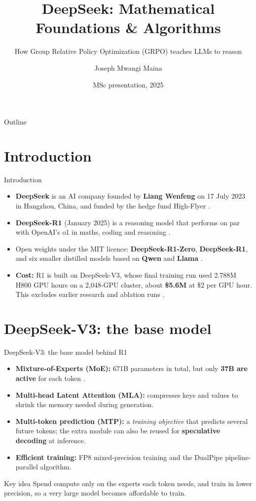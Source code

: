 \documentclass[xcolor=svgnames]{beamer}
\title[DeepSeek: Maths \& Algorithms]{DeepSeek: Mathematical Foundations \& Algorithms}
\subtitle{How Group Relative Policy Optimization (GRPO) teaches LLMs to reason}
\author[Joseph Mwangi Maina]{Joseph Mwangi Maina}
\institute[AIMS Rwanda]{African Institute for Mathematical Sciences (AIMS) Rwanda}
\date{MSc presentation, 2025}
\begin{document}
\frame{\titlepage}

\begin{frame}{Outline}
  \tableofcontents
\end{frame}

\section{Introduction}
\begin{frame}{Introduction}
\begin{itemize}
  \item \textbf{DeepSeek} is an AI company founded by \textbf{Liang Wenfeng} on 17 July 2023 in Hangzhou, China, and funded by the hedge fund High-Flyer \cite{sallam2025deepseek}.
  \item \textbf{DeepSeek-R1} (January 2025) is a reasoning model that performs on par with OpenAI's o1 in maths, coding and reasoning \cite{guo2025deepseekr1}.
  \item Open weights under the MIT licence: \textbf{DeepSeek-R1-Zero}, \textbf{DeepSeek-R1}, and six smaller distilled models based on \textbf{Qwen} and \textbf{Llama} \cite{deepseekr1github}.
  \item \textbf{Cost:} R1 is built on DeepSeek-V3, whose final training run used 2.788M H800 GPU hours on a 2,048-GPU cluster, about \textbf{\$5.6M} at \$2 per GPU hour. This excludes earlier research and ablation runs \cite{liu2024deepseek}.
\end{itemize}
\end{frame}

\section{DeepSeek-V3: the base model}
\begin{frame}{DeepSeek-V3: the base model behind R1}
\begin{itemize}
  \item \textbf{Mixture-of-Experts (MoE):} 671B parameters in total, but only \textbf{37B are active} for each token \cite{liu2024deepseek}.
  \item \textbf{Multi-head Latent Attention (MLA):} compresses keys and values to shrink the memory needed during generation.
  \item \textbf{Multi-token prediction (MTP):} a \emph{training objective} that predicts several future tokens; the extra module can also be reused for \textbf{speculative decoding} at inference.
  \item \textbf{Efficient training:} FP8 mixed-precision training and the DualPipe pipeline-parallel algorithm.
\end{itemize}
\vspace{0.2cm}
\begin{block}{Key idea}
Spend compute only on the experts each token needs, and train in lower precision, so a very large model becomes affordable to train.
\end{block}
\end{frame}
\end{document}
